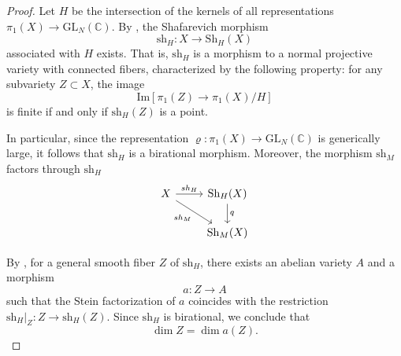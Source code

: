\documentclass[11pt,a4paper,english]{smfart}
\theoremstyle{plain}
\theoremstyle{definition}
\theoremstyle{plain}
\newcommand\GL{\mathrm{GL}}
\def\bC{\mathbb{C}}
\begin{document}
\begin{proof}
	\medspace
	
	 Let \( H \) be the intersection of the kernels of all representations \( \pi_1(X) \to \GL_N(\bC) \). By \cite[Theorem~1]{EKPR12}, the Shafarevich morphism 
	\[
	\mathrm{sh}_H: X \to \mathrm{Sh}_H(X)
	\]
	associated with \( H \) exists. That is, \( \mathrm{sh}_H \) is a morphism to a normal projective variety with connected fibers, characterized by the following property: for any subvariety \( Z \subset X \), the image 
	\[
	\mathrm{Im}[\pi_1(Z) \to \pi_1(X)/H]
	\]
	is finite if and only if \( \mathrm{sh}_H(Z) \) is a point.
	
	In particular, since the representation \( \varrho: \pi_1(X) \to \GL_N(\bC) \) is generically large, it follows that \( \mathrm{sh}_H \) is a birational morphism. Moreover, the morphism \( \mathrm{sh}_M \) factors through \( \mathrm{sh}_H \)
	\begin{equation*}
		\begin{tikzcd}
		X\arrow[r,"{\rm sh}_H"] \arrow[dr, "{\rm sh}_M"' ]& \mathrm{Sh}_H(X)\arrow[d,"q"]\\
&		 \mathrm{Sh}_M(X)
		\end{tikzcd}
	\end{equation*}
	
	By \cite[\S5]{EKPR12}, for a general smooth fiber \( Z \) of \(  \mathrm{sh}_H \), there exists an abelian variety \( A \) and a morphism 
	\[
	a: Z \to A
	\]
	such that the Stein factorization of \( a \) coincides with the restriction \( \mathrm{sh}_H|_Z: Z \to \mathrm{sh}_H(Z) \). Since \( \mathrm{sh}_H \) is birational, we conclude that
	\[
	\dim Z = \dim a(Z).
	\]
	
	\medspace
	

	
	\medspace
	

\end{proof}
\end{document}
